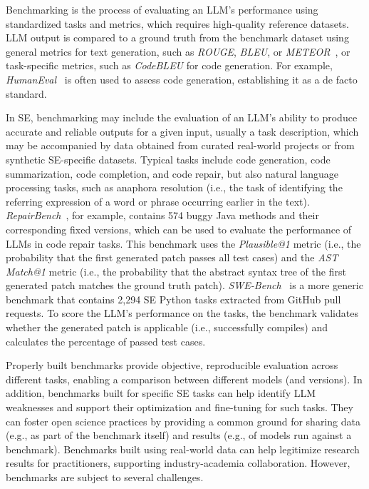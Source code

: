 \label{sec:benchmarking-llms-for-software-engineering-tasks}


Benchmarking is the process of evaluating an LLM's performance using standardized tasks and metrics, which requires high-quality reference datasets.
LLM output is compared to a ground truth from the benchmark dataset using general metrics for text generation, such as \emph{ROUGE}, \emph{BLEU}, or \emph{METEOR}~\cite{10.1145/3695988}, or task-specific metrics, such as \emph{CodeBLEU} for code generation.
For example, \emph{HumanEval}~\cite{DBLP:journals/corr/abs-2107-03374} is often used to assess code generation, establishing it as a de facto standard.


In SE, benchmarking may include the evaluation of an LLM's ability to produce accurate and reliable outputs for a given input, usually a task description, which may be accompanied by data obtained from curated real-world projects or from synthetic SE-specific datasets.
Typical tasks include code generation, code summarization, code completion, and code repair, but also natural language processing tasks, such as anaphora resolution (i.e., the task of identifying the referring expression of a word or phrase occurring earlier in the text). %
\emph{RepairBench}~\cite{silva2024repairbench}, for example, contains 574 buggy Java methods and their corresponding fixed versions, which can be used to evaluate the performance of LLMs in code repair tasks.
This benchmark uses the \emph{Plausible@1} metric (i.e., the probability that the first generated patch passes all test cases) and the \emph{AST Match@1} metric (i.e., the probability that the abstract syntax tree of the first generated patch matches the ground truth patch).
\emph{SWE-Bench}~\cite{DBLP:conf/iclr/JimenezYWYPPN24} is a more generic benchmark that contains 2,294 SE Python tasks extracted from GitHub pull requests.
To score the LLM's performance on the tasks, the benchmark validates whether the generated patch is applicable (i.e., successfully compiles) and calculates the percentage of passed test cases.


Properly built benchmarks provide objective, reproducible evaluation across different tasks, enabling a comparison between different models (and versions).
In addition, benchmarks built for specific SE tasks can help identify LLM weaknesses and support their optimization and fine-tuning for such tasks.
They can foster open science practices by providing a common ground for sharing data (e.g., as part of the benchmark itself) and results (e.g., of models run against a benchmark).
Benchmarks built using real-world data can help legitimize research results for practitioners, supporting industry-academia collaboration.
However, benchmarks are subject to several challenges.

